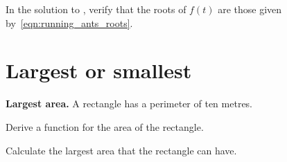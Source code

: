 \documentclass[a4paper,oneside,12pt]{article}
\begin{document}
\begin{exercise}
In the solution to , verify that the roots of
$f(t)$ are those given by~\eqref{eqn:running_ants_roots}.
\end{exercise}



\section{Largest or smallest}

\begin{example}
\label{eg:largest_area_rectangle}
\textbf{Largest area.}
A rectangle has a perimeter of ten metres.
\begin{packedenum}
\item\label{subex:largest_area_perimeter_area}
  Derive a function for the area of the rectangle.

\item\label{subex:largest_area_of_rectangle}
  Calculate the largest area that the rectangle can have.
\end{packedenum}
\end{example}
\end{document}
